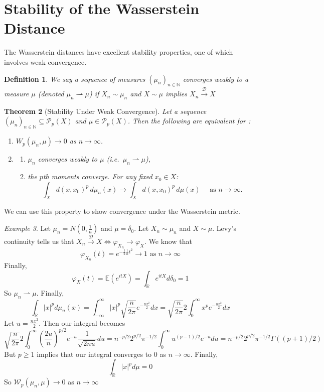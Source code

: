 \documentclass[11pt,a4paper]{article}
\newtheorem{theorem}{Theorem}[section]
\newtheorem{definition}[theorem]{Definition}
\theoremstyle{remark}
\newtheorem{example}[theorem]{Example}
\begin{document}
\section{Stability of the Wasserstein Distance}

The Wasserstein distances have excellent stability properties, one of which involves weak convergence.

\begin{definition}
We say a sequence of measures $(\mu_n)_{n \in \mathbb{N}}$ converges weakly to a measure $\mu$ (denoted $\mu_n \rightharpoonup \mu$) if $X_n \sim \mu_n$ and $X \sim \mu$ implies $X_n \xrightarrow{\mathcal{D}} X$
\end{definition}
\begin{theorem}[Stability Under Weak Convergence]
  Let a sequence $(\mu_n)_{n \in \mathbb{N}}\subseteq\mathcal{P}_p(X)$ and $\mu\in\mathcal{P}_p(X)$. Then the following are equivalent for :
\begin{enumerate}
  \item $W_p(\mu_n,\mu)\to0$ as $n\to\infty$.
  \item 
    \begin{enumerate}
      \item $\mu_n$ converges weakly to $\mu$ (i.e.\ $\mu_n \rightharpoonup \mu$),
      \item the $p$th moments converge. For any fixed $x_0 \in X$:
      \[
        \int_{X} d(x,x_0)^p\,d\mu_n(x)
        \to 
        \int_{X} d(x,x_0)^p\,d\mu(x)
        \quad\text{ as } n \to \infty.
      \]
    \end{enumerate}
\end{enumerate}
\end{theorem}

\noindent We can use this property to show convergence under the Wasserstein metric. 
\begin{example}
Let $\mu _n = N \left (0, \frac{1}{n} \right)$ and $\mu = \delta _0$. Let $X_n \sim \mu _n$ and $X \sim \mu$. Levy's continuity tells us that $X_n \xrightarrow{\mathcal{D}} X \iff \varphi _{X_n} \to \varphi _X$. We know that \[
\varphi_{X_n}(t) = e^{-\frac{1}{2} \frac{1}{n}t^2} \to 1 \text{ as } n \to \infty
\]
Finally, \[
\varphi _X (t) = \mathbb{E} (e^{itX}) = \int _{\mathbb{R}} e^{itX} d \delta_0 = 1
\]
So $\mu _n \rightharpoonup \mu$. Finally, \[
\int_\mathbb{R} |x|^p d\mu _n (x) = \int _{-\infty} ^{\infty} |x|^p \sqrt{\frac{{n}}{{2\pi}}} e^{-\frac{nx^2}{2}} dx = \sqrt{\frac{n}{2\pi}} 2 \int _0 ^{\infty}x^p e^{-\frac{nx^2}{2}}dx
\]
Let $u = \frac{nx^2}{2}$. Then our integral becomes \[
\sqrt{\frac{n}{2 \pi}} 2 \int _0 ^\infty \left ( \frac{2u}{n} \right)^{p/2} e^{-u} \frac{1}{\sqrt{2nu}} du = n^{-p/2} 2^{p/2} \pi ^{-1/2} \int _0 ^\infty u^{(p-1)/2} e^{-u}du = n^{-p/2} 2^{p/2} \pi ^{-1/2} \Gamma ((p+1)/2)
\]
But $p \ge 1$ implies that our integral converges to $0$ as $n \to \infty$. Finally,
\[
\int_\mathbb{R} |x|^p d \mu = 0
\]
So $\mathcal{W}_p (\mu _n, \mu) \to 0$ as $n \to \infty$
\end{example}
\end{document}
